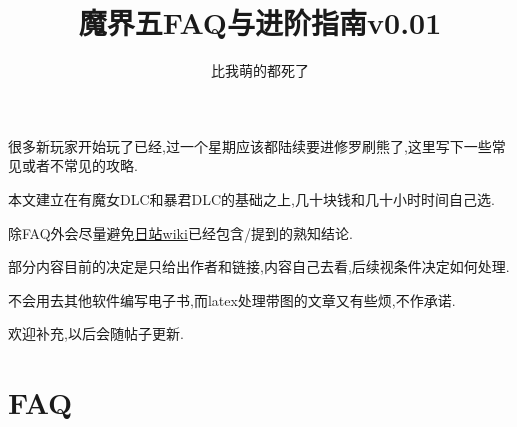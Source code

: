 



\title{魔界五FAQ与进阶指南v0.01}
\author{比我萌的都死了}

\maketitle

很多新玩家开始玩了已经,过一个星期应该都陆续要进修罗刷熊了,这里写下一些常见或者不常见的攻略.

本文建立在有魔女DLC和暴君DLC的基础之上,几十块钱和几十小时时间自己选.

除FAQ外会尽量避免\href{http://wikinavi.net/disgaea5/index.php}{日站wiki}已经包含/提到的熟知结论.

部分内容目前的决定是只给出作者和链接,内容自己去看,后续视条件决定如何处理.

不会用去其他软件编写电子书,而latex处理带图的文章又有些烦,不作承诺.

欢迎补充,以后会随帖子更新.

\tableofcontents
\newpage



\newpage

\section{FAQ}

